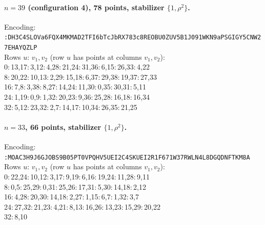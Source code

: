 \paragraph{$n=39$ (configuration 4), 78 points, stabilizer $\{1,\rho^2\}$.} Encoding:\\
{\small \texttt{:DH3C4SLOVa6FQX4MKMAD2TFI6bTcJ\allowbreak bRX783c8REOBU0ZUV5B1J091WKN9aP\allowbreak SGIGY5CNW27EHAYQZLP}}\\
Rows $u:\,v_1,v_2$ (row $u$ has points at columns $v_1,v_2$):\\
{\small
  0:\,13,17:\,3,12:\,4,28:\,21,24:\,31,36:\,6,15:\,26,33:\,4,22 \\
  8:\,20,22:\,10,13:\,2,29:\,15,18:\,6,37:\,29,38:\,19,37:\,27,33 \\
  16:\,7,8:\,3,38:\,8,27:\,14,24:\,11,30:\,0,35:\,30,31:\,5,11 \\
  24:\,1,19:\,0,9:\,1,32:\,20,23:\,9,36:\,25,28:\,16,18:\,16,34 \\
  32:\,5,12:\,23,32:\,2,7:\,14,17:\,10,34:\,26,35:\,21,25
}

\paragraph{$n=33$, 66 points, stabilizer $\{1,\rho^2\}$.} Encoding:\\
{\small \texttt{:MOAC3H9J6GJOBS9B05PT0VPQHV5UE\allowbreak I2C4SKUEI2R1F671W37RWLN4L8DGQD\allowbreak NFTKM8A}}\\
Rows $u:\,v_1,v_2$ (row $u$ has points at columns $v_1,v_2$):\\
{\small
  0:\,22,24:\,10,12:\,3,17:\,9,19:\,6,16:\,19,24:\,11,28:\,9,11 \\
  8:\,0,5:\,25,29:\,0,31:\,25,26:\,17,31:\,5,30:\,14,18:\,2,12 \\
  16:\,4,28:\,20,30:\,14,18:\,2,27:\,1,15:\,6,7:\,1,32:\,3,7 \\
  24:\,27,32:\,21,23:\,4,21:\,8,13:\,16,26:\,13,23:\,15,29:\,20,22 \\
  32:\,8,10
}
